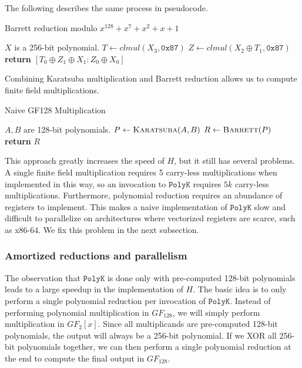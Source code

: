 \documentclass[hctr.tex]{subfiles}
\begin{document}
The following describes the same process in pseudocode.
\begin{algorithm}[H]
	\caption{Barrett reduction modulo $x^{128} + x^7 + x^2 + x + 1$}\label{barrett}
\begin{algorithmic}[1]
	\Require $X$ is a 256-bit polynomial.
	 
		\State $T \gets clmul(X_3, \texttt{0x87})$
		\State $Z \gets clmul(X_2 \oplus T_1, \texttt{0x87})$ 
		\State \textbf{return} $[T_0 \oplus Z_1 \oplus X_1 : Z_0 \oplus X_0]$
	\EndProcedure
\end{algorithmic}
\end{algorithm}
Combining Karatsuba multiplication and Barrett reduction allows us to compute finite field multiplications.
\begin{algorithm}[H]
	\caption{Naive GF128 Multiplication}\label{GF128Naive}
\begin{algorithmic}[1]
	\Require $A, B$ are 128-bit polynomials.
		\State $P \gets \Call{Karatsuba}{A, B}$
		\State $R \gets \Call{Barrett}{P}$
		\State \textbf{return} $R$
	\EndProcedure
\end{algorithmic}
\end{algorithm}
This approach greatly increases the speed of $H$, but it still has several problems. A single finite field multiplication requires 5 carry-less multiplications when implemented in this way, so an invocation to $\texttt{PolyK}$ requires $5k$ carry-less multiplications. Furthermore, polynomial reduction requires an abundance of registers to implement. This makes a naive implementation of $\texttt{PolyK}$ slow and difficult to parallelize on architectures where vectorized registers are scarce, such as x86-64. We fix this problem in the next subsection.

\subsubsection{Amortized reductions and parallelism}
The observation that $\texttt{PolyK}$ is done only with pre-computed 128-bit polynomials leads to a large speedup in the implementation of $H$. The basic idea is to only perform a single polynomial reduction per invocation of $\texttt{PolyK}$. Instead of performing polynomial multiplication in $GF_{128}$, we will simply perform multiplication in $GF_{2}[x]$. Since all multiplicands are pre-computed 128-bit polynomials, the output will always be a 256-bit polynomial. If we XOR all 256-bit polynomials together, we can then perform a single polynomial reduction at the end to compute the final output in $GF_{128}$.
\end{document}
